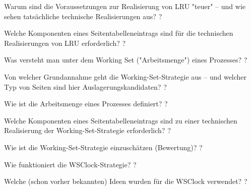 \documentclass[avery5371]{flashcards}
\begin{document}
\begin{flashcard}[Speichermanagement]{Warum sind die Voraussetzungen zur Realisierung von LRU "teuer" – und wie sehen tatsächliche technische Realisierungen aus? }
    ?
\end{flashcard}

\begin{flashcard}[Speichermanagement]{Welche Komponenten eines Seitentabelleneintrags sind für die technischen Realisierungen von LRU erforderlich?}
    ?
\end{flashcard}

\begin{flashcard}[Speichermanagement]{Was versteht man unter dem Working Set ("Arbeitsmenge") eines Prozesses?}
    ?
\end{flashcard}

\begin{flashcard}[Speichermanagement]{Von welcher Grundannahme geht die Working-Set-Strategie aus – und welcher Typ von Seiten sind hier Auslagerungskandidaten? }
    ?
\end{flashcard}

\begin{flashcard}[Speichermanagement]{Wie ist die Arbeitsmenge eines Prozesses definiert? }
    ?
\end{flashcard}

\begin{flashcard}[Speichermanagement]{Welche Komponenten eines Seitentabelleneintrags sind zu einer technischen Realisierung der Working-Set-Strategie erforderlich? }
    ?
\end{flashcard}

\begin{flashcard}[Speichermanagement]{Wie ist die Working-Set-Strategie einzuschätzen (Bewertung)? }
    ?
\end{flashcard}

\begin{flashcard}[Speichermanagement]{Wie funktioniert die WSClock-Strategie?}
    ?
\end{flashcard}

\begin{flashcard}[Speichermanagement]{Welche (schon vorher bekannten) Ideen wurden für die WSClock verwendet? }
    ?
\end{flashcard}
\end{document}

